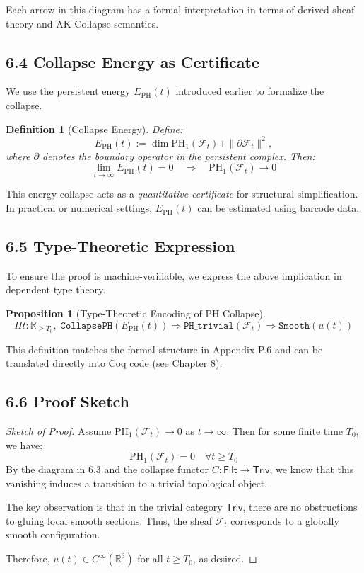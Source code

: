 \documentclass[11pt]{article}
\newtheorem{definition}[theorem]{Definition}
\newtheorem{proposition}[theorem]{Proposition}
\begin{document}
Each arrow in this diagram has a formal interpretation in terms of derived sheaf theory and AK Collapse semantics.

\subsection{6.4 Collapse Energy as Certificate}

We use the persistent energy \( E_{\mathrm{PH}}(t) \) introduced earlier to formalize the collapse.

\begin{definition}[Collapse Energy]
Define:
\[
E_{\mathrm{PH}}(t) := \dim \mathrm{PH}_1(\mathcal{F}_t) + \|\partial \mathcal{F}_t\|^2,
\]
where \( \partial \) denotes the boundary operator in the persistent complex.  
Then:
\[
\lim_{t \to \infty} E_{\mathrm{PH}}(t) = 0 \quad \Rightarrow \quad \mathrm{PH}_1(\mathcal{F}_t) \to 0
\]
\end{definition}

This energy collapse acts as a \emph{quantitative certificate} for structural simplification.  
In practical or numerical settings, \( E_{\mathrm{PH}}(t) \) can be estimated using barcode data.

\subsection{6.5 Type-Theoretic Expression}

To ensure the proof is machine-verifiable, we express the above implication in dependent type theory.

\begin{proposition}[Type-Theoretic Encoding of PH Collapse]
\[
\Pi t : \mathbb{R}_{\ge T_0},\;
\texttt{CollapsePH}(E_{\mathrm{PH}}(t)) \Rightarrow
\texttt{PH\_trivial}(\mathcal{F}_t) \Rightarrow
\texttt{Smooth}(u(t))
\]
\end{proposition}

This definition matches the formal structure in Appendix P.6 and can be translated directly into Coq code (see Chapter 8).

\subsection{6.6 Proof Sketch}

\begin{proof}[Sketch of Proof]
Assume \( \mathrm{PH}_1(\mathcal{F}_t) \to 0 \) as \( t \to \infty \).  
Then for some finite time \( T_0 \), we have:
\[
\mathrm{PH}_1(\mathcal{F}_t) = 0 \quad \forall t \ge T_0
\]
By the diagram in 6.3 and the collapse functor \( C: \mathsf{Filt} \to \mathsf{Triv} \),  
we know that this vanishing induces a transition to a trivial topological object.

The key observation is that in the trivial category \( \mathsf{Triv} \),  
there are no obstructions to gluing local smooth sections.  
Thus, the sheaf \( \mathcal{F}_t \) corresponds to a globally smooth configuration.

Therefore, \( u(t) \in C^\infty(\mathbb{R}^3) \) for all \( t \ge T_0 \), as desired.
\end{proof}
\end{document}
